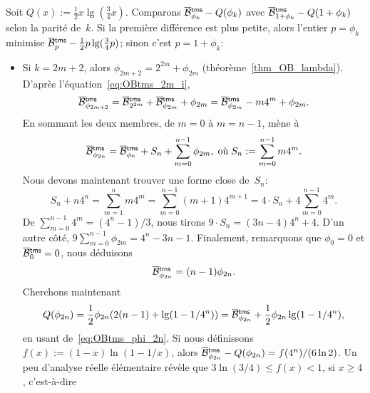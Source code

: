\noindent Soit \(Q(x) := \tfrac{1}{2}x\lg(\tfrac{3}{4}x)\).  Comparons
\(\OB{\fun{tms}}{\phi_k} - Q(\phi_k)\) avec \(\OB{\fun{tms}}{1+\phi_k}
- Q(1+\phi_k)\) selon la parité de~\(k\). Si la première différence
est plus petite, alors l'entier \(p=\phi_k\) minimise
\(\OB{\fun{tms}}{p} - \tfrac{1}{2}p\lg(\tfrac{3}{4}p)\); sinon c'est
\(p=1+\phi_k\):
\begin{itemize}

  \item Si \(k=2m+2\), alors \(\phi_{2m+2} = 2^{2m} + \phi_{2m}\)
    (théorème~\ref{thm_OB_lambda}). D'après
    l'équation~\eqref{eq:OBtms_2m_i},
    \begin{equation*}
      \OB{\fun{tms}}{\phi_{2m+2}} = \OB{\fun{tms}}{2^{2m}} +
    \OB{\fun{tms}}{\phi_{2m}} + \phi_{2m} = \OB{\fun{tms}}{\phi_{2m}}
    - m4^m + \phi_{2m}.
    \end{equation*}
    En sommant les deux membres, de \(m=0\) à \(m=n-1\), mène à
    \begin{equation*}
      \OB{\fun{tms}}{\phi_{2n}} = \OB{\fun{tms}}{\phi_0} + S_n
    + \sum_{m=0}^{n-1}{\phi_{2m}},\; \text{où}\; S_n :=
    \sum_{m=0}^{n-1}{m4^m}.
    \end{equation*}
    Nous devons maintenant trouver une forme close de~\(S_n\):
    \begin{equation*}
      S_n + n4^n = \sum_{m=1}^{n}{m4^m}
                 = \sum_{m=0}^{n-1}(m+1)4^{m+1}
                 = 4 \cdot S_n + 4\sum_{m=0}^{n-1}4^m.
    \end{equation*}
    De \(\sum_{m=0}^{n-1}4^m = (4^n-1)/3\), nous tirons \(9 \cdot S_n
    = (3n -4)4^n + 4\). D'un autre côté, \(9
    \sum_{m=0}^{n-1}{\phi_{2m}} = 4^n - 3n - 1\). Finalement,
    remarquons que \(\phi_0 = 0\) et \(\OB{\fun{tms}}{0} = 0\), nous
    déduisons
    \begin{equation}
      \OB{\fun{tms}}{\phi_{2n}} = (n-1)\phi_{2n}.
      \label{eq:OBtms_phi_2n}
    \end{equation}
    Cherchons maintenant
    \begin{equation*}
      Q(\phi_{2n}) = \frac{1}{2}\phi_{2n}(2(n-1)
      + \lg(1-1/4^n)) = \OB{\fun{tms}}{\phi_{2n}}
      + \frac{1}{2}\phi_{2n}\lg(1-1/4^n),
    \end{equation*}
    en usant de~\eqref{eq:OBtms_phi_2n}. Si nous définissons \(f(x) :=
    (1-x) \ln(1-1/x)\), alors \(\OB{\fun{tms}}{\phi_{2n}} -
    Q(\phi_{2n}) = f(4^n)/(6\ln 2)\). Un peu d'analyse réelle
    élémentaire révèle que \(3\ln(3/4) \leqslant f(x) < 1\),
    si \(x \geqslant 4\), c'est-à-dire

\end{itemize}
